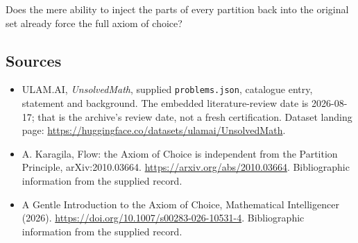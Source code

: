 \documentclass[11pt,a4paper]{article}
\begin{document}
Does the mere ability to inject the parts of every partition back into the original set already force the full axiom of choice?

\subsection{Sources}

{\small

\begin{itemize}

\item[\hypertarget{source:statement:1}{S1}] ULAM.AI, \emph{UnsolvedMath}, supplied \texttt{problems.json}, catalogue entry, statement and background. The embedded literature-review date is 2026-08-17; that is the archive’s review date, not a fresh certification. Dataset landing page: \url{https://huggingface.co/datasets/ulamai/UnsolvedMath}.

\item[\hypertarget{source:statement:2}{S2}] A. Karagila, Flow: the Axiom of Choice is independent from the Partition Principle, arXiv:2010.03664. \url{https://arxiv.org/abs/2010.03664}. Bibliographic information from the supplied record.

\item[\hypertarget{source:statement:3}{S3}] A Gentle Introduction to the Axiom of Choice, Mathematical Intelligencer (2026). \url{https://doi.org/10.1007/s00283-026-10531-4}. Bibliographic information from the supplied record.

\end{itemize}

}

\label{end:statement}
\end{document}
